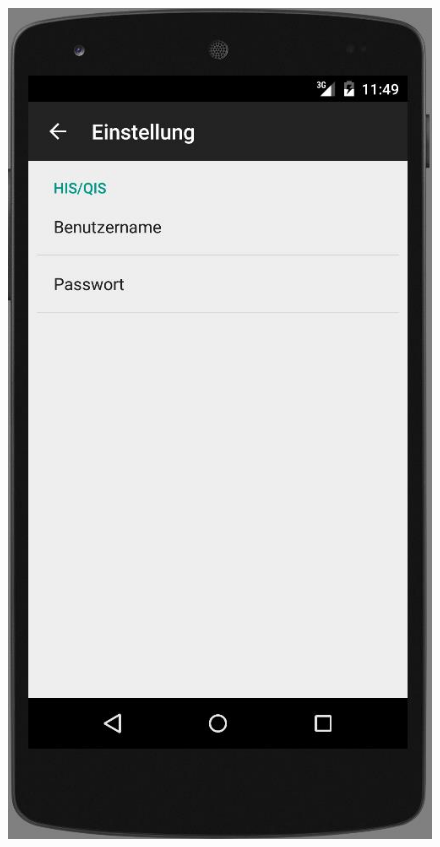 \begin{figure}[htb]
    \centering
    \begin{minipage}{0.45\linewidth}
        \centering
        \includegraphics[scale=0.5]{03_Bedienungsanleitung/img/einstellungen.jpg}
    \end{minipage}

\end{figure}
